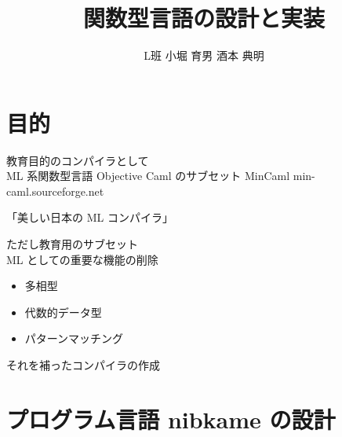 \documentclass[papersize,30pt,slide]{jsarticle}
\begin{document}
\title{関数型言語の設計と実装}
\author{L班  小堀 育男  酒本 典明}
\date{}
\maketitle

\tableofcontents

\section{目的}
教育目的のコンパイラとして \\
ML 系関数型言語 Objective Caml のサブセット MinCaml min-caml.sourceforge.net

「美しい日本の ML コンパイラ」

ただし教育用のサブセット \\
ML としての重要な機能の削除
\begin{itemize}
\item 多相型
\item 代数的データ型
\item パターンマッチング
\end{itemize}

それを補ったコンパイラの作成

\section{プログラム言語 nibkame の設計}
\end{document}
